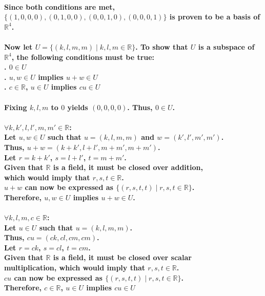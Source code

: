 \documentclass{article}
\begin{document}
\paragraph{\large
Since both conditions are met, $\{(1,0,0,0), (0,1,0,0),(0,0,1,0),(0,0,0,1)\}$ is proven to be a basis of $\mathbb{R}^4$.}

\paragraph{\large
Now let $U = \{(k, l, m, m)\;|\;k,l,m \in \mathbb{R}\}$. To show that $U$ is a subspace of $\mathbb{R}^4$, the following conditions must be true:
\\. $0 \in U$
\\. $u,w \in U$ implies $u + w \in U$
\\. $c \in \mathbb{R}$, $u \in U$ implies $cu \in U$}

\paragraph{\large
Fixing $k,l,m$ to $0$ yields $(0,0,0,0)$. Thus, $0 \in U$.}

\paragraph{\large
$\forall k,k',l,l',m,m' \in \mathbb{R}$:
\\\indent Let $u,w \in U$ such that $u = (k, l, m, m)$ and $w = (k', l', m', m')$.
\\\indent Thus, $u + w = (k+k',l+l',m+m',m+m')$.
\\\indent Let $r = k + k'$, $s = l + l'$, $t = m + m'$. 
\\\indent Given that $\mathbb{R}$ is a field, it must be closed over addition, \\\indent which would imply that $r,s,t \in \mathbb{R}$.
\\\indent $u + w$ can now be expressed as $\{(r, s, t, t)\;|\;r,s,t \in \mathbb{R}\}$.
\\Therefore, $u,w \in U$ implies $u + w \in U$.}

\paragraph{\large
$\forall k,l,m,c \in \mathbb{R}$:
\\\indent Let $u \in U$ such that $u = (k,l,m,m)$.
\\\indent Thus, $cu = (ck,cl,cm,cm)$.
\\\indent Let $r = ck$, $s = cl$, $t = cm$.
\\\indent Given that $\mathbb{R}$ is a field, it must be closed over scalar \\\indent multiplication, which would imply that $r,s,t \in \mathbb{R}$.
\\\indent $cu$ can now be expressed as $\{(r, s, t, t)\;|\;r,s,t \in \mathbb{R}\}$.
\\ Therefore, $c \in \mathbb{R}$, $u \in U$ implies $cu \in U$}
\end{document}
